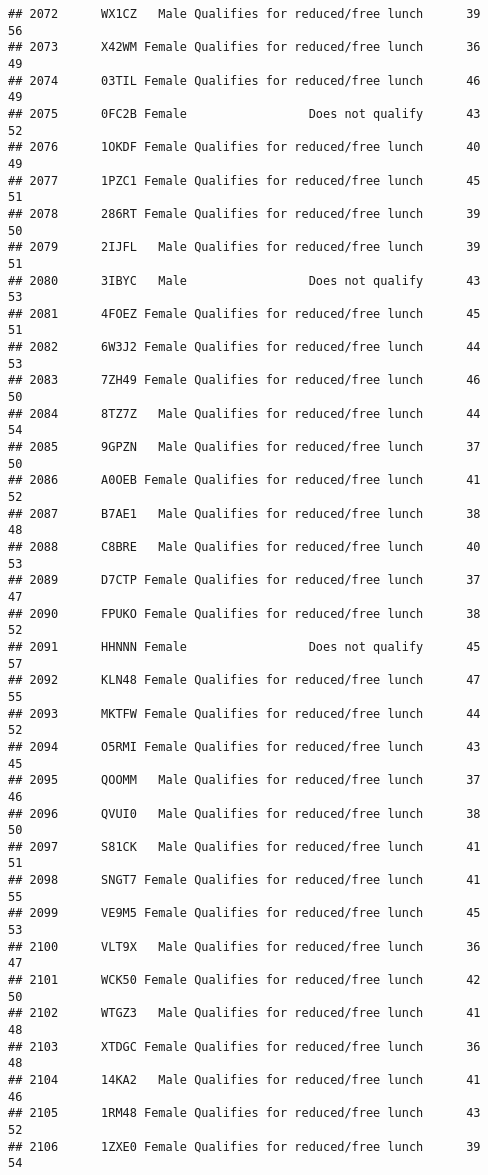 \documentclass[
]{article}
\begin{document}
\begin{verbatim}
## 2072      WX1CZ   Male Qualifies for reduced/free lunch      39       56
## 2073      X42WM Female Qualifies for reduced/free lunch      36       49
## 2074      03TIL Female Qualifies for reduced/free lunch      46       49
## 2075      0FC2B Female                 Does not qualify      43       52
## 2076      1OKDF Female Qualifies for reduced/free lunch      40       49
## 2077      1PZC1 Female Qualifies for reduced/free lunch      45       51
## 2078      286RT Female Qualifies for reduced/free lunch      39       50
## 2079      2IJFL   Male Qualifies for reduced/free lunch      39       51
## 2080      3IBYC   Male                 Does not qualify      43       53
## 2081      4FOEZ Female Qualifies for reduced/free lunch      45       51
## 2082      6W3J2 Female Qualifies for reduced/free lunch      44       53
## 2083      7ZH49 Female Qualifies for reduced/free lunch      46       50
## 2084      8TZ7Z   Male Qualifies for reduced/free lunch      44       54
## 2085      9GPZN   Male Qualifies for reduced/free lunch      37       50
## 2086      A0OEB Female Qualifies for reduced/free lunch      41       52
## 2087      B7AE1   Male Qualifies for reduced/free lunch      38       48
## 2088      C8BRE   Male Qualifies for reduced/free lunch      40       53
## 2089      D7CTP Female Qualifies for reduced/free lunch      37       47
## 2090      FPUKO Female Qualifies for reduced/free lunch      38       52
## 2091      HHNNN Female                 Does not qualify      45       57
## 2092      KLN48 Female Qualifies for reduced/free lunch      47       55
## 2093      MKTFW Female Qualifies for reduced/free lunch      44       52
## 2094      O5RMI Female Qualifies for reduced/free lunch      43       45
## 2095      QOOMM   Male Qualifies for reduced/free lunch      37       46
## 2096      QVUI0   Male Qualifies for reduced/free lunch      38       50
## 2097      S81CK   Male Qualifies for reduced/free lunch      41       51
## 2098      SNGT7 Female Qualifies for reduced/free lunch      41       55
## 2099      VE9M5 Female Qualifies for reduced/free lunch      45       53
## 2100      VLT9X   Male Qualifies for reduced/free lunch      36       47
## 2101      WCK50 Female Qualifies for reduced/free lunch      42       50
## 2102      WTGZ3   Male Qualifies for reduced/free lunch      41       48
## 2103      XTDGC Female Qualifies for reduced/free lunch      36       48
## 2104      14KA2   Male Qualifies for reduced/free lunch      41       46
## 2105      1RM48 Female Qualifies for reduced/free lunch      43       52
## 2106      1ZXE0 Female Qualifies for reduced/free lunch      39       54

\end{verbatim}
\end{document}
